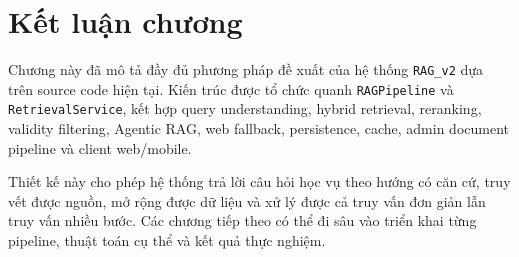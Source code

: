 \documentclass[../DoAn.tex]{subfiles}
\begin{document}
\section{Kết luận chương}

Chương này đã mô tả đầy đủ phương pháp đề xuất của hệ thống \texttt{RAG\_v2}
dựa trên source code hiện tại. Kiến trúc được tổ chức quanh \texttt{RAGPipeline}
và \texttt{RetrievalService}, kết hợp query understanding, hybrid retrieval,
reranking, validity filtering, Agentic RAG, web fallback, persistence, cache,
admin document pipeline và client web/mobile.

Thiết kế này cho phép hệ thống trả lời câu hỏi học vụ theo hướng có căn cứ,
truy vết được nguồn, mở rộng được dữ liệu và xử lý được cả truy vấn đơn giản lẫn
truy vấn nhiều bước. Các chương tiếp theo có thể đi sâu vào triển khai từng
pipeline, thuật toán cụ thể và kết quả thực nghiệm.
\end{document}
